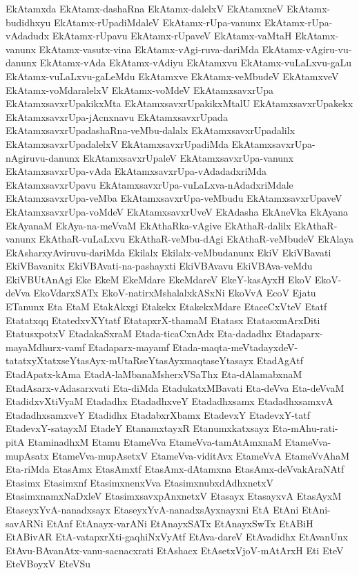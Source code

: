 {EkAtamxda
EkAtamx-dashaRna
EkAtamx-dalelxV
EkAtamxneV
EkAtamx-budidhxyu
EkAtamx-rUpadiMdaleV
EkAtamx-rUpa-vanunx
EkAtamx-rUpa-vAdadudx
EkAtamx-rUpavu
EkAtamx-rUpaveV
EkAtamx-vaMtaH
EkAtamx-vanunx
EkAtamx-vasutx-vina
EkAtamx-vAgi-ruva-dariMda
EkAtamx-vAgiru-vu-danunx
EkAtamx-vAda
EkAtamx-vAdiyu
EkAtamxvu
EkAtamx-vuLaLxvu-gaLu
EkAtamx-vuLaLxvu-gaLeMdu
EkAtamxve
EkAtamx-veMbudeV
EkAtamxveV
EkAtamx-voMdaralelxV
EkAtamx-voMdeV
EkAtamxsavxrUpa
EkAtamxsavxrUpakikxMta
EkAtamxsavxrUpakikxMtalU
EkAtamxsavxrUpakekx
EkAtamxsavxrUpa-jAcnxnavu
EkAtamxsavxrUpada
EkAtamxsavxrUpadashaRna-veMbu-dalalx
EkAtamxsavxrUpadalilx
EkAtamxsavxrUpadalelxV
EkAtamxsavxrUpadiMda
EkAtamxsavxrUpa-nAgiruvu-danunx
EkAtamxsavxrUpaleV
EkAtamxsavxrUpa-vanunx
EkAtamxsavxrUpa-vAda
EkAtamxsavxrUpa-vAdadadxriMda
EkAtamxsavxrUpavu
EkAtamxsavxrUpa-vuLaLxva-nAdadxriMdale
EkAtamxsavxrUpa-veMba
EkAtamxsavxrUpa-veMbudu
EkAtamxsavxrUpaveV
EkAtamxsavxrUpa-voMdeV
EkAtamxsavxrUveV
EkAdasha
EkAneVka
EkAyana
EkAyanaM
EkAya-na-meVvaM
EkAthaRka-vAgive
EkAthaR-dalilx
EkAthaR-vanunx
EkAthaR-vuLaLxvu
EkAthaR-veMbu-dAgi
EkAthaR-veMbudeV
EkAlaya
EkAsharxyAviruvu-dariMda
Ekilalx
Ekilalx-veMbudanunx
EkiV
EkiVBavati
EkiVBavanitx
EkiVBAvati-na-pashayxti
EkiVBAvavu
EkiVBAva-veMdu
EkiVBUtAnAgi
Eke
EkeM
EkeMdare
EkeMdareV
EkeY-kasAyxH
EkoV
EkoV-deVva
EkoVdarxSATx
EkoV-natirxMshalalxkASxNi
EkoVvA
EcoV
Ejatu
ETanunx
Eta
EtaM
EtakAkxgi
Etakekx
EtakekxMdare
EtaceCxVteV
Etatf
Etatatxqq
EtatedxvXYtatf
EtatapxrX-thamaM
Etatasx
EtatasxmArxDiti
EtatusxpotxV
EtadakaSxraM
Etada-ticaCxnAdx
Eta-dadadhx
Etadaparx-mayaMdhurx-vamf
Etadaparx-mayamf
Etada-maqta-meVtadayxdeV-tatatxyXtatxseYtasAyx-mUtaRseYtasAyxmaqtaseYtasayx
EtadAgAtf
EtadApatx-kAma
EtadA-laMbanaMsherxVSaThx
Eta-dAlamabxnaM
EtadAsarx-vAdasarxvati
Eta-diMda
EtadukatxMBavati
Eta-deVva
Eta-deVvaM
EtadidxvXtiVyaM
Etadadhx
EtadadhxveY
Etadadhxsamx
EtadadhxsamxvA
EtadadhxsamxveY
Etadidhx
EtadabxrXbamx
EtadevxY
EtadevxY-tatf
EtadevxY-satayxM
EtadeY
EtanamxtayxR
Etanumxkatxsayx
Eta-mAhu-rati-pitA
EtaminadhxM
Etamu
EtameVva
EtameVva-tamAtAmxnaM
EtameVva-mupAsatx
EtameVva-mupAsetxV
EtameVva-viditAvx
EtameVvA
EtameVvAhaM
Eta-riMda
EtasAmx
EtasAmxtf
EtasAmx-dAtamxna
EtasAmx-deVvakAraNAtf
Etasimx
Etasimxnf
EtasimxnenxVva
EtasimxnubxdAdhxnetxV
EtasimxnamxNaDxleV
EtasimxsavxpAnxnetxV
Etasayx
EtasayxvA
EtasAyxM
EtaseyxYvA-nanadxsayx
EtaseyxYvA-nanadxsAyxnayxni
EtA
EtAni
EtAni-savARNi
EtAnf
EtAnayx-varANi
EtAnayxSATx
EtAnayxSwTx
EtABiH
EtABivAR
EtA-vatapxrXti-gaqhiNxVyAtf
EtAva-dareV
EtAvadidhx
EtAvanUnx
EtAvu-BAvanAtx-vanu-sacnacxrati
EtAshacx
EtAsetxVjoV-mAtArxH
Eti
EteV
EteVBoyxV
EteVSu
}
